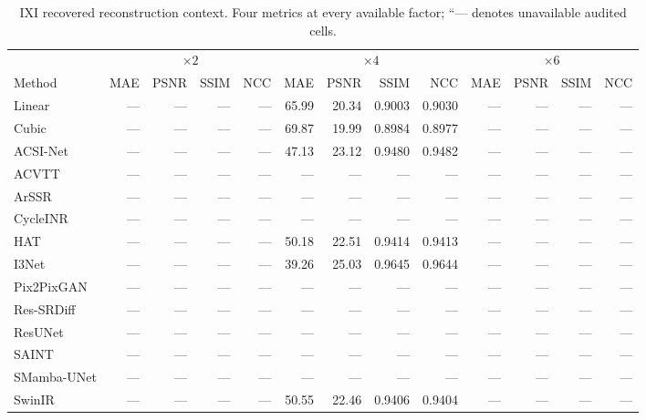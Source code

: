 \begin{table}[t]
\caption{IXI recovered reconstruction context. Four metrics at every available factor; ``--- denotes unavailable audited cells.}
\label{tab:arch-benchmark-ixi}\centering\scriptsize
\setlength{\tabcolsep}{3pt}
\begin{tabular}{lrrrrrrrrrrrr}
\toprule
&\multicolumn{4}{c}{$\times2$}&\multicolumn{4}{c}{$\times4$}&\multicolumn{4}{c}{$\times6$}\\
Method&MAE&PSNR&SSIM&NCC&MAE&PSNR&SSIM&NCC&MAE&PSNR&SSIM&NCC\\
\midrule
Linear & --- & --- & --- & --- & 65.99 & 20.34 & 0.9003 & 0.9030 & --- & --- & --- & --- \\
Cubic & --- & --- & --- & --- & 69.87 & 19.99 & 0.8984 & 0.8977 & --- & --- & --- & --- \\
ACSI-Net & --- & --- & --- & --- & 47.13 & 23.12 & 0.9480 & 0.9482 & --- & --- & --- & --- \\
ACVTT & --- & --- & --- & --- & --- & --- & --- & --- & --- & --- & --- & --- \\
ArSSR & --- & --- & --- & --- & --- & --- & --- & --- & --- & --- & --- & --- \\
CycleINR & --- & --- & --- & --- & --- & --- & --- & --- & --- & --- & --- & --- \\
HAT & --- & --- & --- & --- & 50.18 & 22.51 & 0.9414 & 0.9413 & --- & --- & --- & --- \\
I3Net & --- & --- & --- & --- & 39.26 & 25.03 & 0.9645 & 0.9644 & --- & --- & --- & --- \\
Pix2PixGAN & --- & --- & --- & --- & --- & --- & --- & --- & --- & --- & --- & --- \\
Res-SRDiff & --- & --- & --- & --- & --- & --- & --- & --- & --- & --- & --- & --- \\
ResUNet & --- & --- & --- & --- & --- & --- & --- & --- & --- & --- & --- & --- \\
SAINT & --- & --- & --- & --- & --- & --- & --- & --- & --- & --- & --- & --- \\
SMamba-UNet & --- & --- & --- & --- & --- & --- & --- & --- & --- & --- & --- & --- \\
SwinIR & --- & --- & --- & --- & 50.55 & 22.46 & 0.9406 & 0.9404 & --- & --- & --- & --- \\
\bottomrule
\end{tabular}
\end{table}
